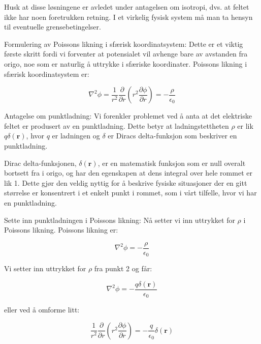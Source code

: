 Husk at disse løsningene er avledet under antagelsen om isotropi, dvs. at feltet ikke har noen foretrukken retning. I et virkelig fysisk system må man ta hensyn til eventuelle grensebetingelser.



Formulering av Poissons likning i sfærisk koordinatsystem: Dette er et viktig første skritt fordi vi forventer at potensialet vil avhenge bare av avstanden fra origo, noe som er naturlig å uttrykke i sfæriske koordinater. Poissons likning i sfærisk koordinatsystem er:

\begin{equation*}
\nabla^2 \phi = \frac{1}{r^2} \frac{\partial}{\partial r} \left(r^2 \frac{\partial \phi}{\partial r}\right) = - \frac{\rho}{\epsilon_0}
\end{equation*}

Antagelse om punktladning: Vi forenkler problemet ved å anta at det elektriske feltet er produsert av en punktladning. Dette betyr at ladningstettheten $\rho$ er lik $q \delta(\mathbf{r})$, hvor $q$ er ladningen og $\delta$ er Diracs delta-funksjon som beskriver en punktladning.

Dirac delta-funksjonen, $\delta(\mathbf{r})$, er en matematisk funksjon som er null overalt bortsett fra i origo, og har den egenskapen at dens integral over hele rommet er lik 1. Dette gjør den veldig nyttig for å beskrive fysiske situasjoner der en gitt størrelse er konsentrert i et enkelt punkt i rommet, som i vårt tilfelle, hvor vi har en punktladning.

Sette inn punktladningen i Poissons likning: Nå setter vi inn uttrykket for $\rho$ i Poissons likning. Poissons likning er:

\begin{equation*}
\nabla^2 \phi = -\frac{\rho}{\epsilon_0}
\end{equation*}

Vi setter inn uttrykket for $\rho$ fra punkt 2 og får:

\begin{equation*}
\nabla^2 \phi = -\frac{q \delta(\mathbf{r})}{\epsilon_0}
\end{equation*}

eller ved å omforme litt:

\begin{equation*}
\frac{1}{r^2} \frac{\partial}{\partial r} \left(r^2 \frac{\partial \phi}{\partial r}\right) = - \frac{q}{\epsilon_0} \delta(\mathbf{r})
\end{equation*}

